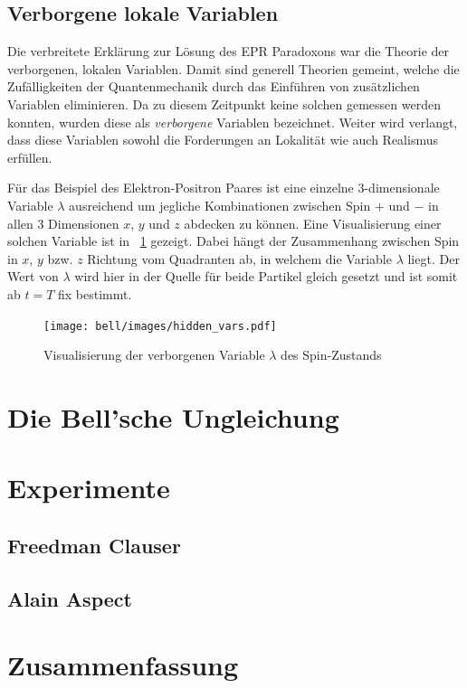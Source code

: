 \begin{refsection}

\subsection{Verborgene lokale Variablen}
Die verbreitete Erkl\"arung zur L\"osung des EPR Paradoxons war die Theorie
der verborgenen, lokalen Variablen. Damit sind generell Theorien gemeint,
welche die Zuf\"alligkeiten der Quantenmechanik durch das Einf\"uhren von
zus\"atzlichen Variablen eliminieren. Da zu diesem Zeitpunkt keine solchen
gemessen werden konnten, wurden diese als \emph{verborgene}
Variablen bezeichnet. Weiter wird verlangt, dass diese Variablen sowohl
die Forderungen an Lokalit\"at wie auch Realismus erf\"ullen.

F\"ur das Beispiel des Elektron-Positron Paares ist eine 
einzelne 3-dimensionale Variable $\lambda$ ausreichend um jegliche
Kombinationen zwischen Spin $+$ und $-$ in allen 3 Dimensionen 
$x$, $y$ und $z$ abdecken zu k\"onnen.
Eine Visualisierung einer solchen Variable ist in
\figurename~\ref{fig:Bell:hidden_var} gezeigt. Dabei h\"angt der Zusammenhang
zwischen Spin in $x$, $y$ bzw. $z$ Richtung vom Quadranten ab, in welchem
die Variable $\lambda$ liegt. Der Wert von $\lambda$ wird hier in der Quelle
f\"ur beide Partikel gleich gesetzt und ist somit ab $t=T$ fix bestimmt.

\begin{figure}
    \centering
    \texttt{[image: bell/images/hidden\_vars.pdf]}
    \caption{Visualisierung der verborgenen Variable $\lambda$ des Spin-Zustands}
    \label{fig:Bell:hidden_var}
\end{figure}


\section{Die Bell'sche Ungleichung}


\section{Experimente}
\subsection{Freedman Clauser}
\subsection{Alain Aspect}

\section{Zusammenfassung}


\printbibliography[heading=subbibliography]
\end{refsection}

